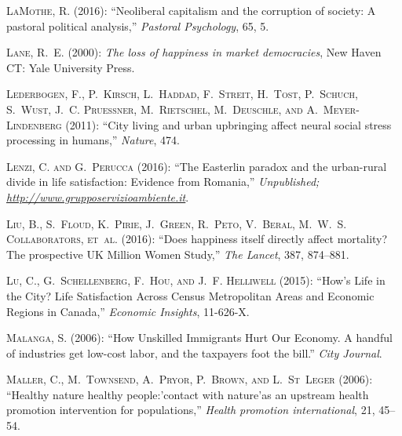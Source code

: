 \documentclass[10pt, letterpaper]{article}
\begin{document}
\begin{spacing}{2.0}
\begin{thebibliography}{115}
\textsc{LaMothe, R.} (2016): \enquote{Neoliberal capitalism and the corruption
  of society: A pastoral political analysis,} \emph{Pastoral Psychology}, 65,
  5.

\textsc{Lane, R.~E.} (2000): \emph{The loss of happiness in market
  democracies}, New Haven CT: Yale University Press.

\textsc{Lederbogen, F., P.~Kirsch, L.~Haddad, F.~Streit, H.~Tost, P.~Schuch,
  S.~Wust, J.~C. Pruessner, M.~Rietschel, M.~Deuschle, and
  A.~{Meyer-Lindenberg}} (2011): \enquote{City living and urban upbringing
  affect neural social stress processing in humans,} \emph{Nature}, 474.

\textsc{Lenzi, C. and G.~Perucca} (2016): \enquote{The Easterlin paradox and
  the urban-rural divide in life satisfaction: Evidence from Romania,}
  \emph{Unpublished; \url{http://www.grupposervizioambiente.it}}.

\textsc{Liu, B., S.~Floud, K.~Pirie, J.~Green, R.~Peto, V.~Beral, M.~W.~S.
  Collaborators, et~al.} (2016): \enquote{Does happiness itself directly affect
  mortality? The prospective UK Million Women Study,} \emph{The Lancet}, 387,
  874--881.

\textsc{Lu, C., G.~Schellenberg, F.~Hou, and J.~F. Helliwell} (2015):
  \enquote{How's Life in the City? Life Satisfaction Across Census Metropolitan
  Areas and Economic Regions in Canada,} \emph{Economic Insights}, 11-626-X.

\textsc{Malanga, S.} (2006): \enquote{How Unskilled Immigrants Hurt Our
  Economy. A handful of industries get low-cost labor, and the taxpayers foot
  the bill.} \emph{City Journal}.

\textsc{Maller, C., M.~Townsend, A.~Pryor, P.~Brown, and L.~St~Leger} (2006):
  \enquote{Healthy nature healthy people:'contact with nature'as an upstream
  health promotion intervention for populations,} \emph{Health promotion
  international}, 21, 45--54.


\end{thebibliography}
\end{spacing}
\end{document}
